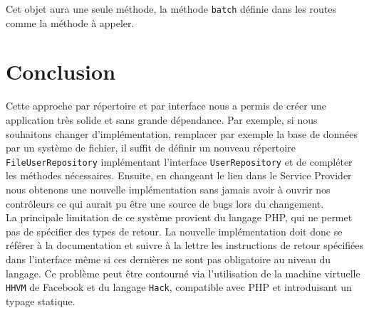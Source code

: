 	Cet objet aura une seule méthode, la méthode \verb|batch| définie dans les routes comme la méthode à appeler.

\section{Conclusion}
	Cette approche par répertoire et par interface nous a permis de créer une application très solide et sans grande dépendance. Par exemple, si nous souhaitons changer d'implémentation, remplacer par exemple la base de données par un système de fichier, il suffit de définir un nouveau répertoire \verb|FileUserRepository| implémentant l'interface \verb|UserRepository| et de compléter les méthodes nécessaires. Ensuite, en changeant le lien dans le Service Provider nous obtenons une nouvelle implémentation sans jamais avoir à ouvrir nos contrôleurs ce qui aurait pu être une source de bugs lors du changement.\\

	La principale limitation de ce système provient du langage PHP, qui ne permet pas de spécifier des types de retour. La nouvelle implémentation doit donc se référer à la documentation et suivre à la lettre les instructions de retour spécifiées dans l'interface même si ces dernières ne sont pas obligatoire au niveau du langage. Ce problème peut être contourné via l'utilisation de la machine virtuelle \verb|HHVM| de Facebook et du langage \verb|Hack|, compatible avec PHP et introduisant un typage statique.